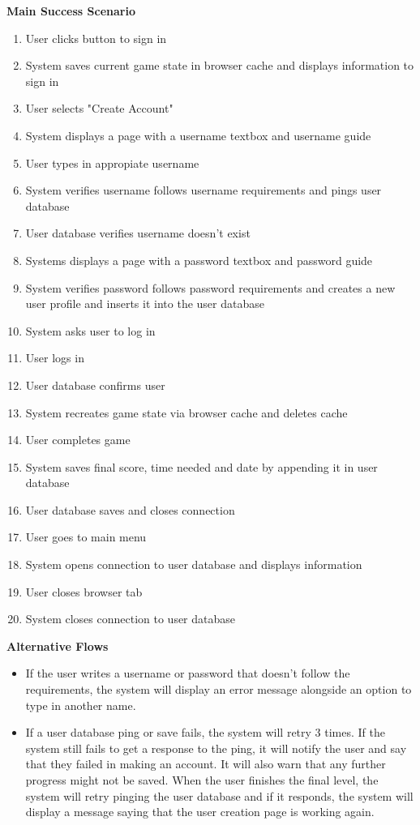 \documentclass[12pt]{article}
\begin{document}
\textbf{Main Success Scenario}
\begin{enumerate}
\item User clicks button to sign in
\item System saves current game state in browser cache and displays information to sign in
\item User selects "Create Account"
\item System displays a page with a username textbox and username guide
\item User types in appropiate username
\item System verifies username follows username requirements and pings user database
\item User database verifies username doesn't exist
\item Systems displays a page with a password textbox and password guide
\item System verifies password follows password requirements and creates a new user profile and inserts it into the user database
\item System asks user to log in
\item User logs in
\item User database confirms user
\item System recreates game state via browser cache and deletes cache
\item User completes game
\item System saves final score, time needed and date by appending it in user database
\item User database saves and closes connection
\item User goes to main menu
\item System opens connection to user database and displays information
\item User closes browser tab
\item System closes connection to user database
\end{enumerate}

\textbf{Alternative Flows}
\begin{itemize}
\item If the user writes a username or password that doesn't follow the requirements, the system will display an error message alongside an option to type in another name.
\item If a user database ping or save fails, the system will retry 3 times. If the system still fails to get a response to the ping, it will notify the user and say that they failed in making an account. It will also warn that any further progress might not be saved. When the user finishes the final level, the system will retry pinging the user database and if it responds, the system will display a message saying that the user creation page is working again.
\end{itemize}
\end{document}
